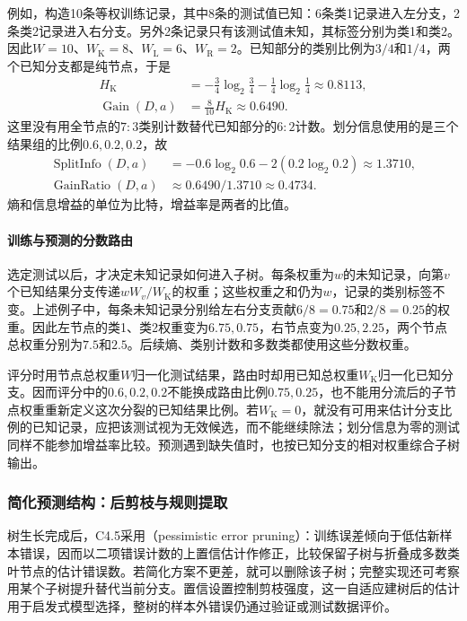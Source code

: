 例如，构造10条等权训练记录，其中8条的测试值已知：6条类1记录进入左分支，2条类2记录进入右分支。另外2条记录只有该测试值未知，其标签分别为类1和类2。因此$W=10$、$W_{\mathrm K}=8$、$W_{\mathrm L}=6$、$W_{\mathrm R}=2$。已知部分的类别比例为$3/4$和$1/4$，两个已知分支都是纯节点，于是
\[
  \begin{aligned}
    H_{\mathrm K}
      &=-\frac34\log_2\frac34-\frac14\log_2\frac14
        \approx0.8113,\\
    \operatorname{Gain}(D,a)
      &=\frac8{10}H_{\mathrm K}\approx0.6490.
  \end{aligned}
\]
这里没有用全节点的$7:3$类别计数替代已知部分的$6:2$计数。划分信息使用的是三个结果组的比例$0.6,0.2,0.2$，故
\[
  \begin{aligned}
    \operatorname{SplitInfo}(D,a)
      &=-0.6\log_2 0.6-2(0.2\log_2 0.2)
        \approx1.3710,\\
    \operatorname{GainRatio}(D,a)
      &\approx0.6490/1.3710\approx0.4734.
  \end{aligned}
\]
熵和信息增益的单位为比特，增益率是两者的比值。

\paragraph{训练与预测的分数路由}
选定测试以后，才决定未知记录如何进入子树。每条权重为$w$的未知记录，向第$v$个已知结果分支传递$wW_v/W_{\mathrm K}$的权重；这些权重之和仍为$w$，记录的类别标签不变。上述例子中，每条未知记录分别给左右分支贡献$6/8=0.75$和$2/8=0.25$的权重。因此左节点的类1、类2权重变为$6.75,0.75$，右节点变为$0.25,2.25$，两个节点总权重分别为$7.5$和$2.5$。后续熵、类别计数和多数类都使用这些分数权重。

评分时用节点总权重$W$归一化测试结果，路由时却用已知总权重$W_{\mathrm K}$归一化已知分支。因而评分中的$0.6,0.2,0.2$不能换成路由比例$0.75,0.25$，也不能用分流后的子节点权重重新定义这次分裂的已知结果比例。若$W_{\mathrm K}=0$，就没有可用来估计分支比例的已知记录，应把该测试视为无效候选，而不能继续除法；划分信息为零的测试同样不能参加增益率比较。预测遇到缺失值时，也按已知分支的相对权重综合子树输出。

\subsubsection{简化预测结构：后剪枝与规则提取}
树生长完成后，C4.5采用（pessimistic error pruning）：训练误差倾向于低估新样本错误，因而以二项错误计数的上置信估计作修正，比较保留子树与折叠成多数类叶节点的估计错误数。若简化方案不更差，就可以删除该子树；完整实现还可考察用某个子树提升替代当前分支。置信设置控制剪枝强度，这一自适应建树后的估计用于启发式模型选择，整树的样本外错误仍通过验证或测试数据评价。


